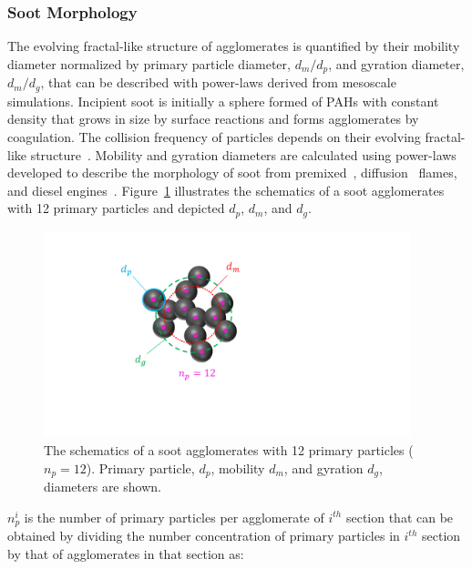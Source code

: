 \subsubsection{Soot Morphology}
\label{sec:sootmorphology}
The evolving fractal-like structure of agglomerates is quantified by their mobility diameter normalized by primary particle diameter, $d_m/d_p$, and gyration diameter, $d_m/d_g$, that can be described with power-laws derived from mesoscale simulations.
Incipient soot is initially a sphere formed of PAHs with constant density that grows in size by surface reactions and forms agglomerates by coagulation. The collision frequency of particles depends on their evolving fractal-like structure~\citep{mulholland1988cluster}. %
Mobility and gyration diameters are calculated using power-laws developed to describe the morphology of soot from premixed~\citep{abid2008evolution}, diffusion~\citep{yon2015simple} flames, and diesel engines~\citep{rissler2013effective}. Figure~\ref{fig:Morphology} illustrates the schematics of a soot agglomerates with 12 primary particles and depicted ${d_p}$, ${d_m}$, and ${d_g}$.  
\begin{figure}[!htbp]
	\centering
	\includegraphics[height=60mm, ]{Figures/Morphology.pdf}
	\caption{The schematics of a soot agglomerates with 12 primary particles (${n_p=12}$). Primary particle, ${d_p}$, mobility ${d_m}$, and gyration ${d_g}$, diameters are shown.}
	\label{fig:Morphology}
\end{figure} 


 ${n^i_p}$ is the number of primary particles per agglomerate of ${i^{th}}$ section that can be obtained by dividing the number concentration of primary particles in ${i^{th}}$ section by that of agglomerates in that section as:

